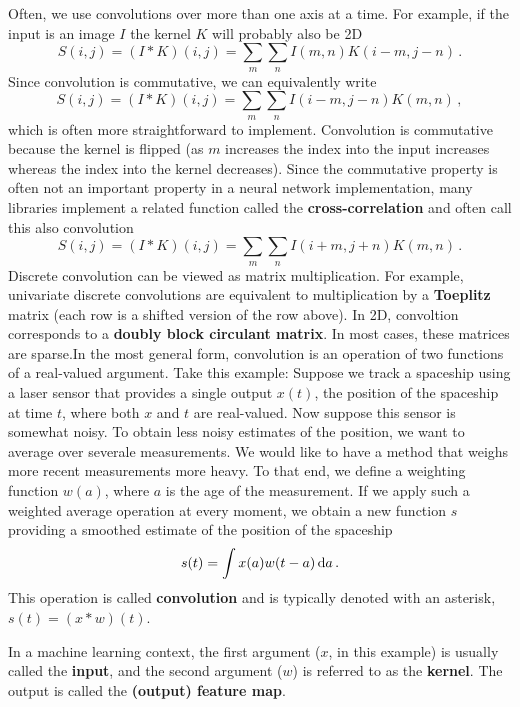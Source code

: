 Often, we use convolutions over more than one axis at a time. For
example, if the input is an image $I$ the kernel $K$ will probably
also be 2D
\begin{equation*}
  S(i,j) = (I \ast K)(i,j) = \sum_m \sum_n I(m,n)K(i-m, j-n)\,.
\end{equation*}
Since convolution is commutative, we can equivalently write
\begin{equation*}
  S(i,j) = (I \ast K)(i,j) = \sum_m \sum_n I(i-m,j-n)K(m, n)\,,
\end{equation*}
which is often more straightforward to implement. Convolution is
commutative because the kernel is flipped (\ie as $m$ increases the
index into the input increases whereas the index into the kernel
decreases). Since the commutative property is often not an important
property in a neural network implementation, many libraries implement
a related function called the \textbf{cross-correlation} and often
call this also convolution
\begin{equation*}
  S(i,j) = (I \ast K)(i,j) = \sum_m \sum_n I(i+m,j+n)K(m, n)\,.
\end{equation*}
Discrete convolution can be viewed as matrix multiplication. For
example, univariate discrete convolutions are equivalent to
multiplication by a \textbf{Toeplitz} matrix (each row is a shifted
version of the row above). In 2D, convoltion corresponds to a
\textbf{doubly block circulant matrix}. In most cases, these
matrices are sparse.In the most general form, convolution is an operation of two functions
of a real-valued argument. Take this example: Suppose we track a
spaceship using a laser sensor that provides a single output $x(t)$,
the position of the spaceship at time $t$, where both $x$ and $t$ are
real-valued. Now suppose this sensor is somewhat noisy. To obtain less
noisy estimates of the position, we want to average over severale
measurements. We would like to have a method that weighs more recent
measurements more heavy. To that end, we define a weighting function
$w(a)$, where $a$ is the age of the measurement. If we apply such a
weighted average operation at every moment, we obtain a new function
$s$ providing a smoothed estimate of the position of the spaceship
\begin{equation*}
  s(t) = \int x(a)w(t-a) \,\mathrm{d}a\,.
\end{equation*}
This operation is called \textbf{convolution} and is typically denoted
with an asterisk, \ie $s(t) = (x \ast w)(t)$.

In a machine learning context, the first argument ($x$, in this
example) is usually called the \textbf{input}, and the second argument
($w$) is referred to as the \textbf{kernel}. The output is called the
\textbf{(output) feature map}.

